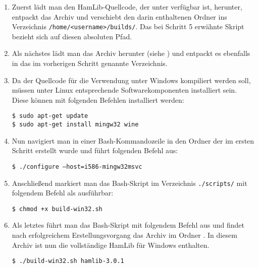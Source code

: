 \begin{enumerate}
	\parskip0pt
	\item Zuerst lädt man den HamLib-Quellcode, der unter \cite{hamlibdownload} verfügbar ist, herunter, entpackt das Archiv  und verschiebt den darin enthaltenen Ordner  ins Verzeichnis \texttt{/home/<username>/builds/}. Das bei Schritt 5 erwähnte Skript bezieht sich auf diesen absoluten Pfad.
	\item Als nächstes lädt man das Archiv  herunter (siehe \cite{libusbdownload}) und entpackt es ebenfalls in das im vorherigen Schritt genannte Verzeichnis.
	\item Da der Quellcode für die Verwendung unter Windows kompiliert werden soll, müssen unter Linux entsprechende Softwarekomponenten installiert sein. Diese können mit folgenden Befehlen installiert werden:
	\vspace{-1em}
	\begin{shaded}
		\texttt{\$ sudo apt-get update}\\[-0.5em]
		\texttt{\$ sudo apt-get install mingw32 wine}
	\end{shaded}
	\newpage
	\item Nun navigiert man in einer Bash-Kommandozeile in den Ordner  der im ersten Schritt erstellt wurde und führt folgenden Befehl aus:
	\vspace{-1em}
	\begin{shaded}
		\texttt{\$ ./configure --host=i586-mingw32msvc}
	\end{shaded}
	\vspace{-1em}
	\item Anschließend markiert man das Bash-Skript  im Verzeichnis \texttt{./scripts/} mit folgendem Befehl als ausführbar:
	\vspace{-1em}
	\begin{shaded}
		\texttt{\$ chmod +x build-win32.sh}
	\end{shaded}
	\vspace{-1em}	
	\item Als letztes führt man das Bash-Skript  mit folgendem Befehl aus und findet nach erfolgreichem Erstellungsvorgang das Archiv  im Ordner . In diesem Archiv ist nun die vollständige HamLib für Windows enthalten.
	\vspace{-1em}
	\begin{shaded}
		\texttt{\$ ./build-win32.sh hamlib-3.0.1}
	\end{shaded}
	\vspace{-1em}	
\end{enumerate}


